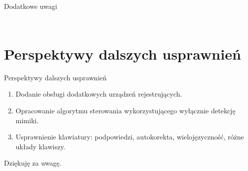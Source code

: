 \documentclass[10pt,aspectratio=169]{beamer}
\begin{document}
\begin{frame}{Dodatkowe uwagi}
\begin{columns}
\begin{column}{0.5\textwidth}
{\begin{figure}[htb]
\begin{subfigure}{\linewidth}
          \end{subfigure}
        \end{figure}
      }
    \end{column}
  \end{columns}
\end{frame}

\section{Perspektywy dalszych usprawnień}

\begin{frame}{Perspektywy dalszych usprawnień}
  \begin{enumerate}[<+-|alert@+>]
    \item Dodanie obsługi dodatkowych urządzeń rejestrujących.
    \item Opracowanie algorytmu sterowania wykorzystującego wyłącznie detekcję mimiki.
    \item Usprawnienie klawiatury: podpowiedzi, autokorekta, wielojęzyczność, różne układy klawiszy.
  \end{enumerate}
\end{frame}

\begin{frame}[standout]
  Dziękuję za uwagę.
\end{frame}
\end{document}
